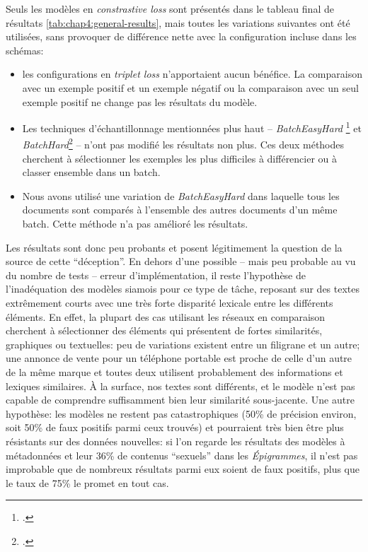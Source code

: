 Seuls les modèles en \textit{constrastive loss} sont présentés dans le tableau final de résultats \ref{tab:chap4:general-results}, mais toutes les variations suivantes ont été utilisées, sans provoquer de différence nette avec la configuration incluse dans les schémas:
\begin{itemize}
    \item les configurations en \textit{triplet loss} n'apportaient aucun bénéfice. La comparaison avec un exemple positif et un exemple négatif ou la comparaison avec un seul exemple positif ne change pas les résultats du modèle.
    \item Les techniques d'échantillonnage mentionnées plus haut -- \textit{BatchEasyHard} \footcite{xuan_improved_2020} et \textit{BatchHard}\footcite{hermans_defense_2017} -- n'ont pas modifié les résultats non plus. Ces deux méthodes cherchent à sélectionner les exemples les plus difficiles à différencier ou à classer ensemble dans un batch.
    \item Nous avons utilisé une  variation de \textit{BatchEasyHard} dans laquelle tous les documents sont comparés à l'ensemble des autres documents d'un même batch. Cette méthode n'a pas amélioré les résultats.
\end{itemize}

Les résultats sont donc peu probants et posent légitimement la question de la source de cette \enquote{déception}. En dehors d'une possible -- mais peu probable au vu du nombre de tests -- erreur d'implémentation, il reste l'hypothèse de l'inadéquation des modèles siamois pour ce type de tâche, reposant sur des textes extrêmement courts avec une très forte disparité lexicale entre les différents éléments. En effet, la plupart des cas utilisant les réseaux en comparaison cherchent à sélectionner des éléments qui présentent de fortes similarités, graphiques ou textuelles: peu de variations existent entre un filigrane et un autre; une annonce de vente pour un téléphone portable est proche de celle d'un autre de la même marque et toutes deux utilisent probablement des informations et lexiques similaires. À la surface, nos textes sont différents, et le modèle n'est pas capable de comprendre suffisamment bien leur similarité sous-jacente. Une autre hypothèse: les modèles ne restent pas catastrophiques (50\% de précision environ, soit 50\% de faux positifs parmi ceux trouvés) et pourraient très bien être plus résistants sur des données nouvelles: si l'on regarde les résultats des modèles à métadonnées et leur 36\% de contenus \enquote{sexuels} dans les \textit{Épigrammes}, il n'est pas improbable que de nombreux résultats parmi eux soient de faux positifs, plus que le taux de 75\% le promet en tout cas.

